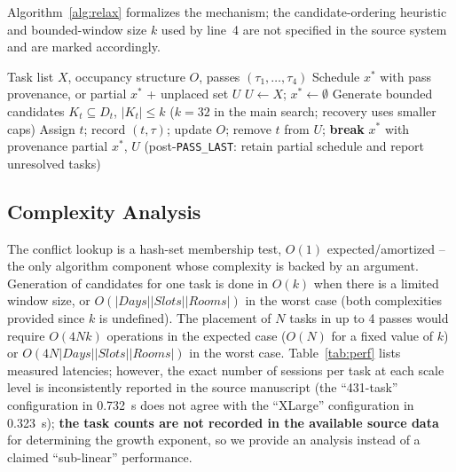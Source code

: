 \documentclass[conference]{IEEEtran}
\begin{document}
Algorithm~\ref{alg:relax} formalizes the mechanism; the candidate-ordering heuristic and bounded-window size $k$ used by line~4 are not specified in the source system and are marked accordingly.

\begin{algorithm}[t]
\caption{Multi-Pass Constrained Slot Allocation}
\label{alg:relax}
\begin{algorithmic}[1]
\footnotesize
\REQUIRE Task list $X$, occupancy structure $O$, passes $(\tau_1,\ldots,\tau_4)$
\ENSURE Schedule $x^*$ with pass provenance, or partial $x^*$ + unplaced set $U$
\STATE $U \leftarrow X$; $x^* \leftarrow \emptyset$
        \STATE Generate bounded candidates $K_t\!\subseteq\!D_t$, $|K_t|\!\leq\!k$ ($k=32$ in the main search; recovery uses smaller caps)
                \STATE Assign $t$; record $(t,\tau)$; update $O$; remove $t$ from $U$; \textbf{break}
            \ENDIF
        \ENDFOR
    \ENDFOR
     \RETURN $x^*$ with provenance \ENDIF
\ENDFOR
\RETURN partial $x^*$, $U$ \quad (post-\texttt{PASS\_LAST}: retain partial schedule and report unresolved tasks)
\end{algorithmic}
\end{algorithm}

\subsection{Complexity Analysis}
\label{sec:complexity}
The conflict lookup is a hash-set membership test, $O(1)$ expected/amortized -- the only algorithm component whose complexity is backed by an argument. Generation of candidates for one task is done in $O(k)$ when there is a limited window size, or $O(|Days||Slots||Rooms|)$ in the worst case (both complexities provided since $k$ is undefined). The placement of $N$ tasks in up to 4 passes would require $O(4Nk)$ operations in the expected case ($O(N)$ for a fixed value of $k$) or $O(4N|Days||Slots||Rooms|)$ in the worst case. Table~\ref{tab:perf} lists measured latencies; however, the exact number of sessions per task at each scale level is inconsistently reported in the source manuscript (the ``431-task'' configuration in 0.732~s does not agree with the ``XLarge'' configuration in 0.323~s); \textbf{the task counts are not recorded in the available source data} for determining the growth exponent, so we provide an analysis instead of a claimed ``sub-linear'' performance.
\end{document}
